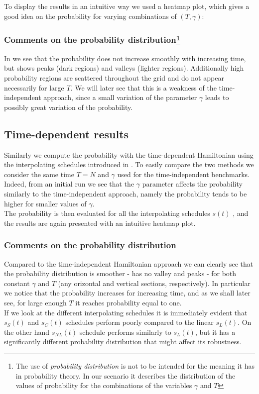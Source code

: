         \noindent
        To display the results in an intuitive way we used a heatmap plot, which gives a good idea on the probability for varying combinations of $(T,\gamma)$:
        

        \subsubsection*{Comments on the probability distribution\footnote{The use of \textit{probability distribution} is not to be intended for the meaning it has in probability theory. In our scenario it describes the distribution of the values of probability for the combinations of the variables $\gamma$ and $T$}}
        In  we see that the probability does not increase smoothly with increasing time, but shows peaks (dark regions) and valleys (lighter regions). Additionally high probability regions are scattered throughout the grid and do not appear necessarily for large $T$. We will later see that this is a weakness of the time-independent approach, since a small variation of the parameter $\gamma$ leads to possibly great variation of the probability.

    \subsection{Time-dependent results}\label{subsec:time_dependent_results}
        Similarly we compute the probability with the time-dependent Hamiltonian using the interpolating schedules introduced in . To easily compare the two methods we consider the same time $T=N$ and $\gamma$ used for the time-independent benchmarks. Indeed, from an initial run we see that the $\gamma$ parameter affects the probability similarly to the time-independent approach, namely the probability tends to be higher for smaller values of $\gamma$.\\
        The probability is then evaluated for all the interpolating schedules $s(t)$ , and the results are again presented with an intuitive heatmap plot.\\
        

        \subsubsection*{Comments on the probability distribution}
        Compared to the time-independent Hamiltonian approach we can clearly see that the probability distribution is smoother - has no valley and peaks - for both constant $\gamma$ and $T$ (any orizontal and vertical sections, respectively). In particular we notice that the probability increases for increasing time, and as we shall later see, for large enough $T$ it reaches probability equal to one.\\ If we look at the different interpolating schedules it is immediately evident that $s_S(t)$ and $s_C(t)$ schedules perform poorly compared to the linear $s_L(t)$. On the other hand $s_{NL}(t)$ schedule performs similarly to $s_L(t)$, but it has a significantly different probability distribution that might affect its robustness.

